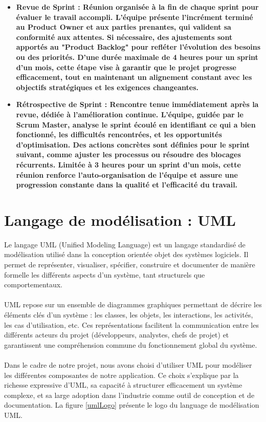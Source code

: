{\begin{itemize}
\item \noindent \bfseries Revue de Sprint  \mdseries : Réunion organisée à la fin de chaque sprint pour évaluer le travail accompli. L’équipe présente l’incrément terminé au Product Owner et aux parties prenantes, qui valident sa conformité aux attentes. Si nécessaire, des ajustements sont apportés au "Product Backlog" pour refléter l’évolution des besoins ou des priorités. D’une durée maximale de 4 heures pour un sprint d’un mois, cette étape vise à garantir que le projet progresse efficacement, tout en maintenant un alignement constant avec les objectifs stratégiques et les exigences changeantes.

\item \noindent \bfseries Rétrospective de Sprint  \mdseries : 
Rencontre tenue immédiatement après la revue, dédiée à l’amélioration continue. L’équipe, guidée par le Scrum Master, analyse le sprint écoulé en identifiant ce qui a bien fonctionné, les difficultés rencontrées, et les opportunités d’optimisation. Des actions concrètes sont définies pour le sprint suivant, comme ajuster les processus ou résoudre des blocages récurrents. Limitée à 3 heures pour un sprint d’un mois, cette réunion renforce l’auto-organisation de l’équipe et assure une progression constante dans la qualité et l’efficacité du travail.

\end{itemize}
\newpage
\section{Langage de modélisation : UML}
Le langage UML (Unified Modeling Language) est un langage standardisé de modélisation utilisé dans la conception orientée objet des systèmes logiciels. Il permet de représenter, visualiser, spécifier, construire et documenter de manière formelle les différents aspects d’un système, tant structurels que comportementaux.\\
\\
UML repose sur un ensemble de diagrammes graphiques permettant de décrire les éléments clés d’un système : les classes, les objets, les interactions, les activités, les cas d'utilisation, etc. Ces représentations facilitent la communication entre les différents acteurs du projet (développeurs, analystes, chefs de projet) et garantissent une compréhension commune du fonctionnement global du système.\\
\\
Dans le cadre de notre projet, nous avons choisi d’utiliser UML pour modéliser les différentes composantes de notre application. Ce choix s’explique par la richesse expressive d’UML, sa capacité à structurer efficacement un système complexe, et sa large adoption dans l’industrie comme outil de conception et de documentation. La figure \ref{umlLogo} présente le logo du language de modélisation UML.\\

}
